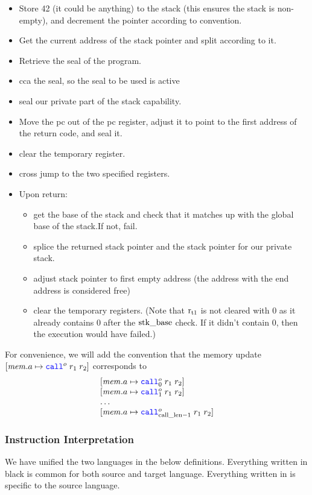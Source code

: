 \documentclass[a4paper]{article}
\begin{document}
\begin{itemize}
\item Store 42 (it could be anything) to the stack (this ensures the stack is non-empty), and decrement the pointer according to convention.
\item Get the current address of the stack pointer and split according to it.
\item Retrieve the seal of the program.
\item cca the seal, so the seal to be used is active 
\item seal our private part of the stack capability.
\item Move the pc out of the pc register, adjust it to point to the first address of the return code, and seal it.
\item clear the temporary register.
\item cross jump to the two specified registers.
\item Upon return:
  \begin{itemize}
  \item get the base of the stack and check that it matches up with the global base of the stack.If not, fail.
  \item splice the returned stack pointer and the stack pointer for our private stack.
  \item adjust stack pointer to first empty address (the address with the end address is considered free)  
  \item clear the temporary registers. (Note that $\mathrm{r}_\mathrm{t1}$ is not cleared with 0 as it already contains 0 after the $\mathrm{stk\_base}$ check. If it didn't contain 0, then the execution would have failed.)

  \end{itemize}
\end{itemize}

For convenience, we will add the convention that the memory update $\update{\mem.a}{\scall{o}{r_1}{r_2}}$ corresponds to
\[
  \begin{array}{l}
    \update{\mem.a}{\scall[0]{o}{r_1}{r_2}}\\
    \update{\mem.a}{\scall[1]{o}{r_1}{r_2}}\\
    \dots\\
    \update{\mem.a}{\scall[\calllen-1]{o}{r_1}{r_2}}\\
  \end{array}
\]

\subsubsection{Instruction Interpretation}
We have unified the two languages in the below definitions. Everything written in black is common for both source and target language. Everything written in  is specific to the source language.
\end{document}
